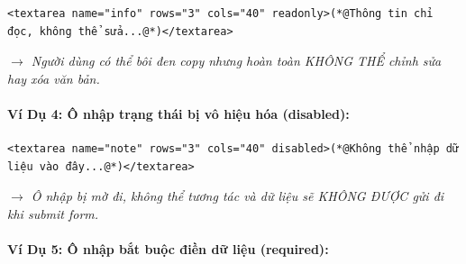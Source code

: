 \begin{codeWindow}
\begin{lstlisting}[language=HTML5]
<textarea name="info" rows="3" cols="40" readonly>(*@Thông tin chỉ đọc, không thể sửa...@*)</textarea>
\end{lstlisting}
\end{codeWindow}

\begin{browserWindow}
\sffamily\small
{} \par\vspace{4pt}
\textcolor{codeComment}{\small\textit{$\rightarrow$ Người dùng có thể bôi đen copy nhưng hoàn toàn KHÔNG THỂ chỉnh sửa hay xóa văn bản.}}
\end{browserWindow}

\paragraph{Ví Dụ 4: Ô nhập trạng thái bị vô hiệu hóa (disabled):}

\begin{codeWindow}
\begin{lstlisting}[language=HTML5]
<textarea name="note" rows="3" cols="40" disabled>(*@Không thể nhập dữ liệu vào đây...@*)</textarea>
\end{lstlisting}
\end{codeWindow}

\begin{browserWindow}
\sffamily\small
{} \par\vspace{4pt}
\textcolor{codeComment}{\small\textit{$\rightarrow$ Ô nhập bị mờ đi, không thể tương tác và dữ liệu sẽ KHÔNG ĐƯỢC gửi đi khi submit form.}}
\end{browserWindow}

\paragraph{Ví Dụ 5: Ô nhập bắt buộc điền dữ liệu (required):}

